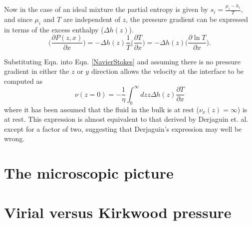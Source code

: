 Now in the case of an ideal mixture the partial entropy is given by $s_{i}=\frac{\mu_{i}-h_{i}}{T}$, and since $\mu_{i}$ and $T$ are independent of $z$, the pressure gradient can be expressed in terms of the excess enthalpy ($\Delta h(z)$).
\begin{equation}
\label{ExcessEnthalpy}
\bigg(\frac{\partial P(z,x)}{\partial x}\bigg)= - \Delta h(z)\frac{1}{T} \bigg( \frac{\partial T}{\partial x} \bigg) 
= - \Delta h(z) \bigg( \frac{\partial \ln T}{\partial x} \bigg).
\end{equation}

Substituting Eqn. \label{ExcessEnthalpy} into Eqn. \ref{NavierStokes} and assuming there is no pressure gradient in either the $z$ or $y$ direction allows the velocity at the interface to be computed as
\begin{equation}
\label{DoubleIntegral}
\nu (z=0) = - \frac{1}{\eta}\int_{0}^{\infty} dz z \Delta h(z) \frac{\partial T}{\partial x}
\end{equation}
where it has been assumed that the fluid in the bulk is at rest ($\nu_{x}(z)=\infty$) is at rest.
This expression is almost equivalent to that derived by Derjaguin et. al. except for a factor of two, suggesting that Derjaguin's expression may well be wrong\cite{SurfaceForces, Anderson}.

\section{The microscopic picture}

\section{Virial versus Kirkwood pressure}



